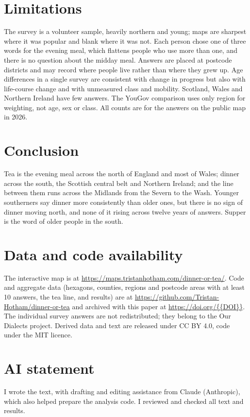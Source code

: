 \documentclass[11pt,a4paper]{article}
\begin{document}
\section{Limitations}
The survey is a volunteer sample, heavily northern and young; maps are sharpest where it was popular and blank where it was not. Each person chose one of three words for the evening meal, which flattens people who use more than one, and there is no question about the midday meal. Answers are placed at postcode districts and may record where people live rather than where they grew up. Age differences in a single survey are consistent with change in progress but also with life-course change and with unmeasured class and mobility. Scotland, Wales and Northern Ireland have few answers. The YouGov comparison uses only region for weighting, not age, sex or class. All counts are for the answers on the public map in 2026.

\section{Conclusion}
Tea is the evening meal across the north of England and most of Wales; dinner across the south, the Scottish central belt and Northern Ireland; and the line between them runs across the Midlands from the Severn to the Wash. Younger southerners say dinner more consistently than older ones, but there is no sign of dinner moving north, and none of it rising across twelve years of answers. Supper is the word of older people in the south.

\section*{Data and code availability}
The interactive map is at \url{https://maps.tristanhotham.com/dinner-or-tea/}. Code and aggregate data (hexagons, counties, regions and postcode areas with at least 10 answers, the tea line, and results) are at \url{https://github.com/Tristan-Hotham/dinner-or-tea} and archived with this paper at \url{https://doi.org/{{DOI}}}. The individual survey answers are not redistributed; they belong to the Our Dialects project. Derived data and text are released under CC BY 4.0, code under the MIT licence.

\section*{AI statement}
I wrote the text, with drafting and editing assistance from Claude (Anthropic), which also helped prepare the analysis code. I reviewed and checked all text and results.
\end{document}
